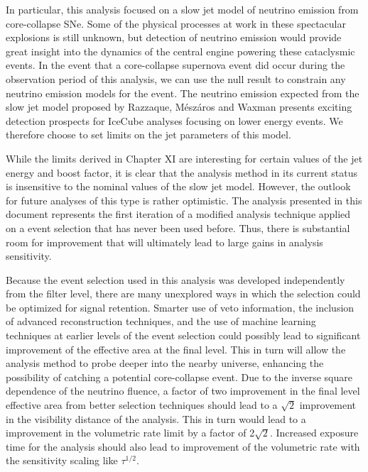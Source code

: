 \documentclass{gatech-thesis}
\begin{document}
In particular, this analysis focused on a slow jet model of neutrino emission from core-collapse SNe. Some of the physical processes at work in these spectacular explosions is still unknown, but detection of neutrino emission would provide great insight into the dynamics of the central engine powering these cataclysmic events. In the event that a core-collapse supernova event did occur during the observation period of this analysis, we can use the null result to constrain any neutrino emission models for the event. The neutrino emission expected from the slow jet model proposed by Razzaque, M\'{e}sz\'{a}ros and Waxman presents exciting detection prospects for IceCube analyses focusing on lower energy events. We therefore choose to set limits on the jet parameters of this model.

While the limits derived in Chapter XI are interesting for certain values of the jet energy and boost factor, it is clear that the analysis method in its current status is insensitive to the nominal values of the slow jet model. However, the outlook for future analyses of this type is rather optimistic. The analysis presented in this document represents the first iteration of a modified analysis technique applied on a event selection that has never been used before. Thus, there is substantial room for improvement that will ultimately lead to large gains in analysis sensitivity.

Because the event selection used in this analysis was developed independently from the filter level, there are many unexplored ways in which the selection could be optimized for signal retention. Smarter use of veto information, the inclusion of advanced reconstruction techniques, and the use of machine learning techniques at earlier levels of the event selection could possibly lead to significant improvement of the effective area at the final level. This in turn will allow the analysis method to probe deeper into the nearby universe, enhancing the possibility of catching a potential core-collapse event. Due to the inverse square dependence of the neutrino fluence, a factor of two improvement in the final level effective area from better selection techniques should lead to a $\sqrt{2}$ improvement in the visibility distance of the analysis. This in turn would lead to a improvement in the volumetric rate limit by a factor of 2$\sqrt{2}$. Increased exposure time for the analysis should also lead to improvement of the volumetric rate with the sensitivity scaling like $\tau^{1/2}$.
\end{document}
